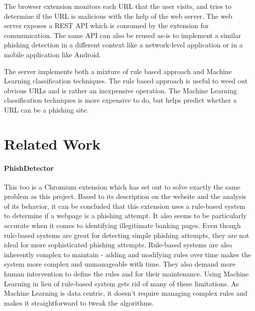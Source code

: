 \documentclass[conference]{IEEEtran}
\begin{document}
\par The browser extension monitors each URL that the user visits, and tries to determine if the URL is malicious with the help of the web server.
The web server exposes a REST API which is consumed by the extension for communication.
The same API can also be reused as-is to implement a similar phishing detection in a different context like a network-level application or in a mobile application like Android.

\par The server implements both a mixture of rule based approach and Machine Learning classification techniques. The rule based approach is useful to weed out obvious URLs and is rather an inexpensive operation. The Machine Learning classification techniques is more expensive to do, but helps predict whether a URL can be a phishing site.

\section{Related Work}
\paragraph{PhishDetector\cite{PhishDetector}}
This too is a Chromium extension which has set out to solve exactly the same problem as this project.
Based to its description on the website and the analysis of its behavior, it can be concluded that this extension uses a rule-based system to determine if a webpage is a phishing attempt.
It also seems to be particularly accurate when it comes to identifying illegitimate banking pages.
Even though rule-based systems are great for detecting simple phishing attempts, they are not ideal for more sophisticated phishing attempts.
Rule-based systems are also inherently complex to maintain - adding and modifying rules over time makes the system more complex and unmanageable with time.
They also demand more human intervention to define the rules and for their maintenance.
Using Machine Learning in lieu of rule-based system gets rid of many of these limitations.
As Machine Learning is data centric, it doesn't require managing complex rules and makes it straightforward to tweak the algorithms.
\end{document}
